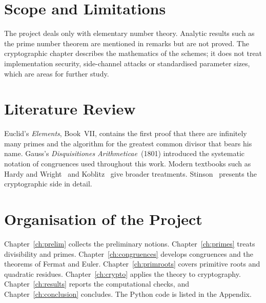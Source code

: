 \section{Scope and Limitations}

The project deals only with elementary number theory. Analytic results such as the prime number theorem are mentioned in remarks but are not proved. The cryptographic chapter describes the mathematics of the schemes; it does not treat implementation security, side-channel attacks or standardised parameter sizes, which are areas for further study.

\section{Literature Review}

Euclid's \emph{Elements}, Book~VII, contains the first proof that there are infinitely many primes and the algorithm for the greatest common divisor that bears his name. Gauss's \emph{Disquisitiones Arithmeticae}~(1801) introduced the systematic notation of congruences used throughout this work. Modern textbooks such as Hardy and Wright~\cite{hardy2008} and Koblitz~\cite{koblitz1994} give broader treatments. Stinson~\cite{stinson2006} presents the cryptographic side in detail.

\section{Organisation of the Project}

Chapter~\ref{ch:prelim} collects the preliminary notions. Chapter~\ref{ch:primes} treats divisibility and primes. Chapter~\ref{ch:congruences} develops congruences and the theorems of Fermat and Euler. Chapter~\ref{ch:primroots} covers primitive roots and quadratic residues. Chapter~\ref{ch:crypto} applies the theory to cryptography. Chapter~\ref{ch:results} reports the computational checks, and Chapter~\ref{ch:conclusion} concludes. The Python code is listed in the Appendix.
